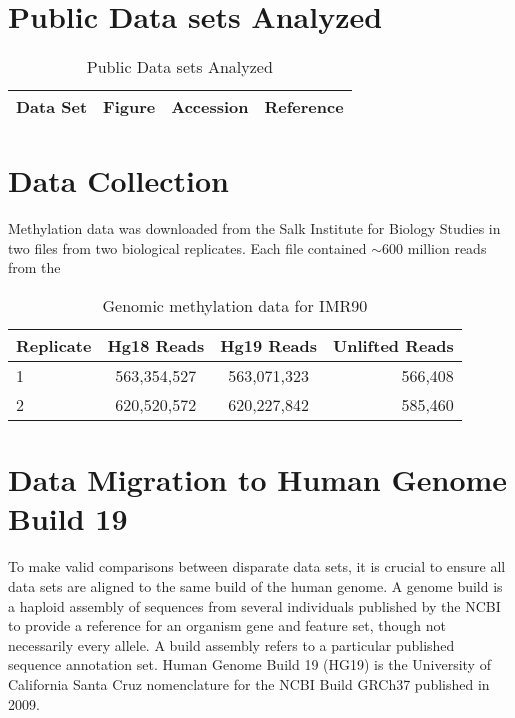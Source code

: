 \chapter{Public Data sets Analyzed}

\begin{table}
  \centering
  \begin{tabular}{lccr}
    \hline
    Data Set & Figure & Accession & Reference \\ \hline
    \hline
  \end{tabular}
  \caption{Public Data sets Analyzed}
\end{table}


\chapter{Data Collection}

Methylation data was downloaded from the Salk Institute for Biology Studies in
two files from two biological replicates.  Each file contained $\sim600$ million
reads from the

\begin{table}
  \centering
  \begin{tabular}{lccr}
    \hline
    Replicate & Hg18 Reads & Hg19 Reads & Unlifted Reads \\ \hline
    1 & 563,354,527 & 563,071,323 & 566,408 \\
    2 & 620,520,572 & 620,227,842 & 585,460 \\
    \hline
  \end{tabular}
  \caption{Genomic methylation data for IMR90}
\end{table}

\chapter{Data Migration to Human Genome Build 19}

To make valid comparisons between disparate data sets, it is crucial to ensure all data sets are aligned to the same
build of the human genome.  A genome build is a haploid assembly of sequences from several individuals published by
the NCBI to provide a reference for an organism gene and feature set, though not necessarily every allele.  A build assembly
refers to a particular published sequence annotation set.  Human Genome Build 19 (HG19) is the University of California Santa
Cruz nomenclature for the NCBI Build GRCh37 published in 2009\cite{NCBI2015}.

